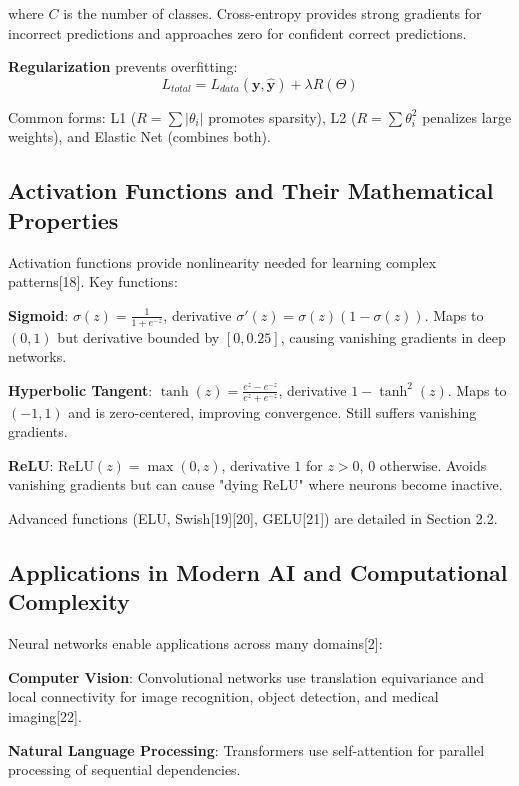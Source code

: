 \documentclass[11pt,a4paper]{report}
\begin{document}
where $C$ is the number of classes. Cross-entropy provides strong gradients for incorrect predictions and approaches zero for confident correct predictions.

\textbf{Regularization} prevents overfitting:
\begin{equation}
L_{total} = L_{data}(\mathbf{y}, \hat{\mathbf{y}}) + \lambda R(\Theta)
\end{equation}

Common forms: L1 ($R = \sum |\theta_i|$ promotes sparsity), L2 ($R = \sum \theta_i^2$ penalizes large weights), and Elastic Net (combines both).

\subsection{Activation Functions and Their Mathematical Properties}

Activation functions provide nonlinearity needed for learning complex patterns[18]. Key functions:

\textbf{Sigmoid}: $\sigma(z) = \frac{1}{1 + e^{-z}}$, derivative $\sigma'(z) = \sigma(z)(1 - \sigma(z))$. Maps to $(0, 1)$ but derivative bounded by $[0, 0.25]$, causing vanishing gradients in deep networks.

\textbf{Hyperbolic Tangent}: $\tanh(z) = \frac{e^z - e^{-z}}{e^z + e^{-z}}$, derivative $1 - \tanh^2(z)$. Maps to $(-1, 1)$ and is zero-centered, improving convergence. Still suffers vanishing gradients.

\textbf{ReLU}: $\text{ReLU}(z) = \max(0, z)$, derivative $1$ for $z > 0$, $0$ otherwise. Avoids vanishing gradients but can cause "dying ReLU" where neurons become inactive.

Advanced functions (ELU, Swish[19][20], GELU[21]) are detailed in Section 2.2.

\subsection{Applications in Modern AI and Computational Complexity}

Neural networks enable applications across many domains[2]:

\textbf{Computer Vision}: Convolutional networks use translation equivariance and local connectivity for image recognition, object detection, and medical imaging[22].

\textbf{Natural Language Processing}: Transformers use self-attention for parallel processing of sequential dependencies.
\end{document}
